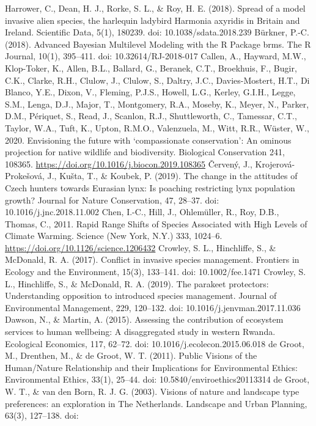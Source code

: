 \documentclass[
]{article}
\begin{document}
Harrower, C., Dean, H. J., Rorke, S. L., \& Roy, H. E. (2018). Spread of
a model invasive alien species, the harlequin ladybird Harmonia axyridis
in Britain and Ireland. Scientific Data, 5(1), 180239. doi:
10.1038/sdata.2018.239 Bürkner, P.-C. (2018). Advanced Bayesian
Multilevel Modeling with the R Package brms. The R Journal, 10(1),
395--411. doi: 10.32614/RJ-2018-017 Callen, A., Hayward, M.W.,
Klop-Toker, K., Allen, B.L., Ballard, G., Beranek, C.T., Broekhuis, F.,
Bugir, C.K., Clarke, R.H., Clulow, J., Clulow, S., Daltry, J.C.,
Davies-Mostert, H.T., Di Blanco, Y.E., Dixon, V., Fleming, P.J.S.,
Howell, L.G., Kerley, G.I.H., Legge, S.M., Lenga, D.J., Major, T.,
Montgomery, R.A., Moseby, K., Meyer, N., Parker, D.M., Périquet, S.,
Read, J., Scanlon, R.J., Shuttleworth, C., Tamessar, C.T., Taylor, W.A.,
Tuft, K., Upton, R.M.O., Valenzuela, M., Witt, R.R., Wüster, W., 2020.
Envisioning the future with `compassionate conservation': An ominous
projection for native wildlife and biodiversity. Biological Conservation
241, 108365. \url{https://doi.org/10.1016/j.biocon.2019.108365} Červený,
J., Krojerová-Prokešová, J., Kušta, T., \& Koubek, P. (2019). The change
in the attitudes of Czech hunters towards Eurasian lynx: Is poaching
restricting lynx population growth? Journal for Nature Conservation, 47,
28--37. doi: 10.1016/j.jnc.2018.11.002 Chen, I.-C., Hill, J.,
Ohlemüller, R., Roy, D.B., Thomas, C., 2011. Rapid Range Shifts of
Species Associated with High Levels of Climate Warming. Science (New
York, N.Y.) 333, 1024--6. \url{https://doi.org/10.1126/science.1206432}
Crowley, S. L., Hinchliffe, S., \& McDonald, R. A. (2017). Conflict in
invasive species management. Frontiers in Ecology and the Environment,
15(3), 133--141. doi: 10.1002/fee.1471 Crowley, S. L., Hinchliffe, S.,
\& McDonald, R. A. (2019). The parakeet protectors: Understanding
opposition to introduced species management. Journal of Environmental
Management, 229, 120--132. doi: 10.1016/j.jenvman.2017.11.036 Dawson,
N., \& Martin, A. (2015). Assessing the contribution of ecosystem
services to human wellbeing: A disaggregated study in western Rwanda.
Ecological Economics, 117, 62--72. doi: 10.1016/j.ecolecon.2015.06.018
de Groot, M., Drenthen, M., \& de Groot, W. T. (2011). Public Visions of
the Human/Nature Relationship and their Implications for Environmental
Ethics: Environmental Ethics, 33(1), 25--44. doi:
10.5840/enviroethics20113314 de Groot, W. T., \& van den Born, R. J. G.
(2003). Visions of nature and landscape type preferences: an exploration
in The Netherlands. Landscape and Urban Planning, 63(3), 127--138. doi:
\end{document}
